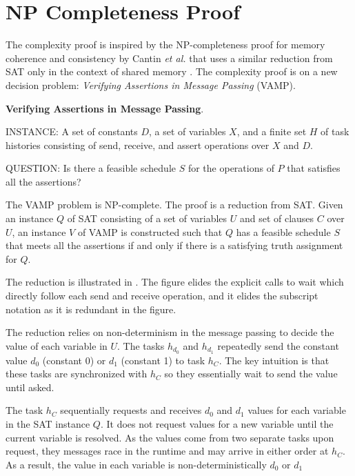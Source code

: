 \section{NP Completeness Proof} 
The complexity proof is inspired by the NP-completeness proof for
memory coherence and consistency by Cantin \emph{et al.} that uses a
similar reduction from SAT only in the context of shared memory
\cite{Cantin:2005:CVM:1070608.1070722}. The complexity proof is on a
new decision problem: \emph{Verifying Assertions in Message Passing}
(VAMP).
\begin{definition}
\textbf{Verifying Assertions in Message Passing}.
\begin{compactdesc}
\item{INSTANCE}: A set of constants $D$, a set of variables $X$, and a
  finite set $H$ of task histories consisting of send, receive, and
  assert operations over $X$ and $D$.
\item{QUESTION}: Is there a feasible schedule $S$ for the operations
  of $P$ that satisfies all the assertions?
\end{compactdesc}
\label{def:np1}
\end{definition}

The VAMP problem is NP-complete. The proof is a reduction from
SAT. Given an instance $Q$ of SAT consisting of a set of variables $U$
and set of clauses $C$ over $U$, an instance $V$ of VAMP is
constructed such that $Q$ has a feasible schedule $S$ that meets all
the assertions if and only if there is a satisfying truth assignment
for $Q$.

The reduction is illustrated in . The figure elides
the explicit calls to wait which directly follow each send and receive
operation, and it elides the subscript notation as it is redundant in
the figure.

The reduction relies on non-determinism in the message passing to
decide the value of each variable in $U$.  The tasks $h_{d_0}$ and
$h_{d_1}$ repeatedly send the constant value $d_0$ (constant 0) or
$d_1$ (constant 1) to task $h_C$. The key intuition is that these
tasks are synchronized with $h_C$ so they essentially wait to send the
value until asked.

The task $h_C$ sequentially requests and receives $d_0$ and $d_1$
values for each variable in the SAT instance $Q$. It does not request
values for a new variable until the current variable is resolved. As
the values come from two separate tasks upon request, they messages
race in the runtime and may arrive in either order at $h_C$. As a
result, the value in each variable is non-deterministically $d_0$ or $d_1$

